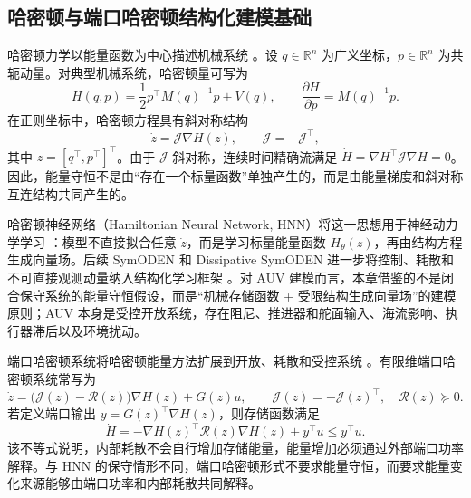 \documentclass[UTF8,zihao=-4]{ctexrep}
\newcommand{\R}{\mathbb{R}}
\begin{document}
\subsection{哈密顿与端口哈密顿结构化建模基础}
\label{subsec:port-hamiltonian-prelim}

哈密顿力学以能量函数为中心描述机械系统 \citep{arnold1989mathematical}。设 \(q\in\R^n\) 为广义坐标，\(p\in\R^n\) 为共轭动量。对典型机械系统，哈密顿量可写为
\begin{equation}
  H(q,p)=\frac12 p^\top M(q)^{-1}p+V(q),
  \qquad
  \frac{\partial H}{\partial p}=M(q)^{-1}p .
  \label{eq:mechanical-hamiltonian}
\end{equation}
在正则坐标中，哈密顿方程具有斜对称结构
\begin{equation}
  \dot z=\mathcal{J}\nabla H(z),
  \qquad
  \mathcal{J}=-\mathcal{J}^\top ,
  \label{eq:hamiltonian-matrix-form}
\end{equation}
其中 \(z=[q^\top,p^\top]^\top\)。由于 \(\mathcal{J}\) 斜对称，连续时间精确流满足 \(\dot H=\nabla H^\top \mathcal{J}\nabla H=0\)。因此，能量守恒不是由“存在一个标量函数”单独产生的，而是由能量梯度和斜对称互连结构共同产生的。

哈密顿神经网络（Hamiltonian Neural Network, HNN）将这一思想用于神经动力学学习 \citep{greydanus2019hamiltonian}：模型不直接拟合任意 \(\dot z\)，而是学习标量能量函数 \(H_\theta(z)\)，再由结构方程生成向量场。后续 SymODEN 和 Dissipative SymODEN 进一步将控制、耗散和不可直接观测动量纳入结构化学习框架 \citep{zhong2020symoden,zhong2020dissipativesymoden}。对 AUV 建模而言，本章借鉴的不是闭合保守系统的能量守恒假设，而是“机械存储函数 + 受限结构生成向量场”的建模原则；AUV 本身是受控开放系统，存在阻尼、推进器和舵面输入、海流影响、执行器滞后以及环境扰动。

端口哈密顿系统将哈密顿能量方法扩展到开放、耗散和受控系统 \citep{vanderschaft2014porthamiltonian,vanderschaft2017l2gain}。有限维端口哈密顿系统常写为
\begin{equation}
  \dot z=
  \bigl(\mathcal{J}(z)-\mathcal R(z)\bigr)\nabla H(z)
  +G(z)u,
  \qquad
  \mathcal{J}(z)=-\mathcal{J}(z)^\top,\quad \mathcal R(z)\succeq0 .
  \label{eq:ph-template}
\end{equation}
若定义端口输出 \(y=G(z)^\top\nabla H(z)\)，则存储函数满足
\begin{equation}
  \dot H
  =
  -\nabla H(z)^\top \mathcal R(z)\nabla H(z)
  +y^\top u
  \le y^\top u .
  \label{eq:ph-energy-template}
\end{equation}
该不等式说明，内部耗散不会自行增加存储能量，能量增加必须通过外部端口功率解释。与 HNN 的保守情形不同，端口哈密顿形式不要求能量守恒，而要求能量变化来源能够由端口功率和内部耗散共同解释。
\end{document}
